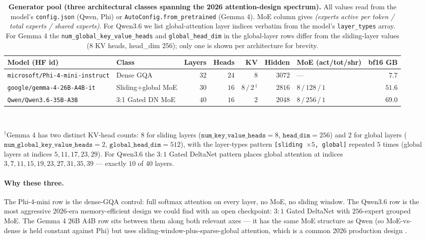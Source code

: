 \documentclass[11pt,letterpaper]{article}
\begin{document}
\begin{table}[t]
\centering
\small
\caption{
\textbf{Generator pool (three architectural classes spanning the 2026
attention-design spectrum).}
All values read from the model's \texttt{config.json} (Qwen, Phi)
or \texttt{AutoConfig.from\_pretrained} (Gemma 4). MoE column gives
\emph{(experts active per token / total experts / shared experts)}.
For Qwen3.6 we list global-attention layer indices verbatim from the
model's \texttt{layer\_types} array. For Gemma 4 the
\texttt{num\_global\_key\_value\_heads} and \texttt{global\_head\_dim}
in the global-layer rows differ from the sliding-layer values
(8 KV heads, head\_dim 256); only one is shown per architecture for
brevity.
}
\label{tab:models}
\begin{tabular}{p{3.4cm}lrrrrlr}
\toprule
\textbf{Model (HF id)} &
\textbf{Class} &
\textbf{Layers} &
\textbf{Heads} &
\textbf{KV} &
\textbf{Hidden} &
\textbf{MoE (act/tot/shr)} &
\textbf{bf16 GB} \\
\midrule
\texttt{microsoft/Phi-4-mini-instruct} &
Dense GQA &
$32$ & $24$ & $8$ & $3072$ & --- & $7.7$ \\
\texttt{google/gemma-4-26B-A4B-it} &
Sliding+global MoE &
$30$ & $16$ & $8\,/\,2$\,$^{\dagger}$ & $2816$ & $8 \,/\, 128 \,/\, 1$ & $51.6$ \\
\texttt{Qwen/Qwen3.6-35B-A3B} &
3:1 Gated DN MoE &
$40$ & $16$ & $2$ & $2048$ & $8 \,/\, 256 \,/\, 1$ & $69.0$ \\
\bottomrule
\end{tabular}
\\[4pt]
\raggedright\footnotesize
$^\dagger$Gemma 4 has two distinct KV-head counts: $8$ for sliding layers
($\texttt{num\_key\_value\_heads}=8$, $\texttt{head\_dim}=256$) and $2$
for global layers ($\texttt{num\_global\_key\_value\_heads}=2$,
$\texttt{global\_head\_dim}=512$), with the layer-types pattern
\texttt{[sliding $\times 5$,\,global]} repeated $5$ times (global layers
at indices $5, 11, 17, 23, 29$).
For Qwen3.6 the $3{:}1$ Gated DeltaNet pattern places global attention
at indices $3, 7, 11, 15, 19, 23, 27, 31, 35, 39$ — exactly $10$ of
$40$ layers.
\end{table}

\paragraph{Why these three.}
The Phi-4-mini row is the dense-GQA control: full softmax attention on
every layer, no MoE, no sliding window. The Qwen3.6 row is the most
aggressive 2026-era memory-efficient design we could find with an open
checkpoint: $3{:}1$ Gated DeltaNet with $256$-expert grouped MoE. The
Gemma 4 26B A4B row sits between them along both relevant axes — it has
the same MoE structure as Qwen (so MoE-vs-dense is held constant against
Phi) but uses sliding-window-plus-sparse-global attention, which is
a common 2026 production design \citep{TODO:gemma3, TODO:gemma4-card}.
\end{document}
